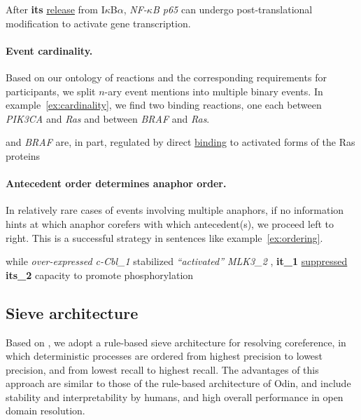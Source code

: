 \begin{exe}
	\ex\label{ex:cataphor}After {\bf its} \underline{release} from I$\kappa$B$\alpha$, {\it NF-$\kappa$B p65} can undergo post-translational modification to activate gene transcription.
\end{exe}

\paragraph{Event cardinality.}

Based on our ontology of reactions and the corresponding requirements for participants, we split $n$-ary event mentions into multiple binary events. In example~\ref{ex:cardinality}, we find two binding reactions, one each between {\it PIK3CA} and {\it Ras} and between {\it BRAF} and {\it Ras}.

\begin{exe}
	\ex\label{ex:cardinality}  and {\it BRAF} are, in part, 
regulated by direct \underline{binding} to activated forms of the Ras proteins\textellipsis
\end{exe}

\paragraph{Antecedent order determines anaphor order.}

In relatively rare cases of events involving multiple anaphors, if no information hints at which anaphor corefers with which antecedent(s), we proceed left to right. This is a successful strategy in sentences like example~\ref{ex:ordering}.

\begin{exe}
	\ex\label{ex:ordering}\textellipsis while {\it over-expressed c-Cbl_1} stabilized {\it ``activated'' MLK3_2} , {\bf it_1} \underline{suppressed} {\bf its_2} capacity to promote phosphorylation \textellipsis
\end{exe}

\subsection{Sieve architecture}

Based on , we adopt a rule-based sieve architecture for resolving coreference, in which 
deterministic processes are ordered from highest precision to lowest precision, and from lowest recall to highest recall. 
The advantages of this approach are similar to those of the rule-based architecture of Odin, and include stability and interpretability by 
humans, and high overall performance in open domain resolution. 

